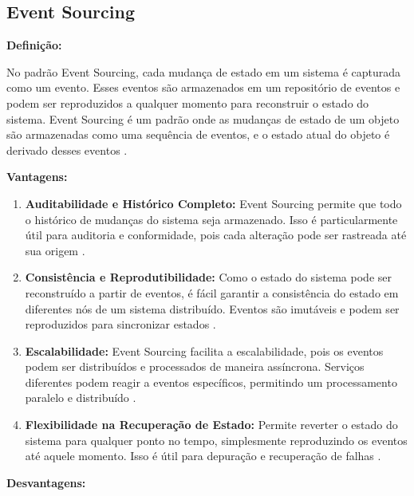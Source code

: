 \subsection{Event Sourcing}

\textbf{Definição:}

No padrão Event Sourcing, cada mudança de estado em um sistema é capturada como um evento. Esses eventos são armazenados em um repositório de eventos e podem ser reproduzidos a qualquer momento para reconstruir o estado do sistema. Event Sourcing é um padrão onde as mudanças de estado de um objeto são armazenadas como uma sequência de eventos, e o estado atual do objeto é derivado desses eventos \cite{fowler2005}.

\textbf{Vantagens:}

\begin{enumerate}
    \item \textbf{Auditabilidade e Histórico Completo:} Event Sourcing permite que todo o histórico de mudanças do sistema seja armazenado. Isso é particularmente útil para auditoria e conformidade, pois cada alteração pode ser rastreada até sua origem \cite{fowler2005}.
    \item \textbf{Consistência e Reprodutibilidade:} Como o estado do sistema pode ser reconstruído a partir de eventos, é fácil garantir a consistência do estado em diferentes nós de um sistema distribuído. Eventos são imutáveis e podem ser reproduzidos para sincronizar estados \cite{richardson2018}.
    \item \textbf{Escalabilidade:} Event Sourcing facilita a escalabilidade, pois os eventos podem ser distribuídos e processados de maneira assíncrona. Serviços diferentes podem reagir a eventos específicos, permitindo um processamento paralelo e distribuído \cite{vernon2013}.
    \item \textbf{Flexibilidade na Recuperação de Estado:} Permite reverter o estado do sistema para qualquer ponto no tempo, simplesmente reproduzindo os eventos até aquele momento. Isso é útil para depuração e recuperação de falhas \cite{fowler2005}.
\end{enumerate}

\textbf{Desvantagens:}

